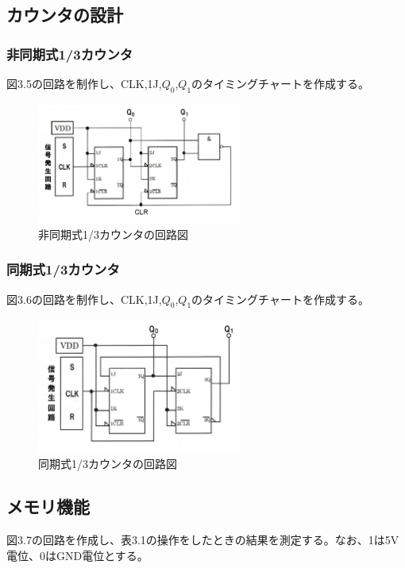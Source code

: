 \documentclass{jlreq}
\numberwithin{equation}{section}
\begin{document}
\subsection{カウンタの設計}
\subsubsection{非同期式1/3カウンタ}
図3.5の回路を制作し、CLK,1J,\(Q_0\),\(Q_1\)のタイミングチャートを作成する。

\begin{figure}[H]
  \centering
  \includegraphics[width=0.6\textwidth]{assets/hidoukicounter.png}
  \caption{非同期式1/3カウンタの回路図}
\end{figure}

\subsubsection{同期式1/3カウンタ}
図3.6の回路を制作し、CLK,1J,\(Q_0\),\(Q_1\)のタイミングチャートを作成する。

\begin{figure}[H]
  \centering
  \includegraphics[width=0.6\textwidth]{assets/doukicounter.png}
  \caption{同期式1/3カウンタの回路図}
\end{figure}

\subsection{メモリ機能}
図3.7の回路を作成し、表3.1の操作をしたときの結果を測定する。なお、1は5V電位、0はGND電位とする。
\end{document}
